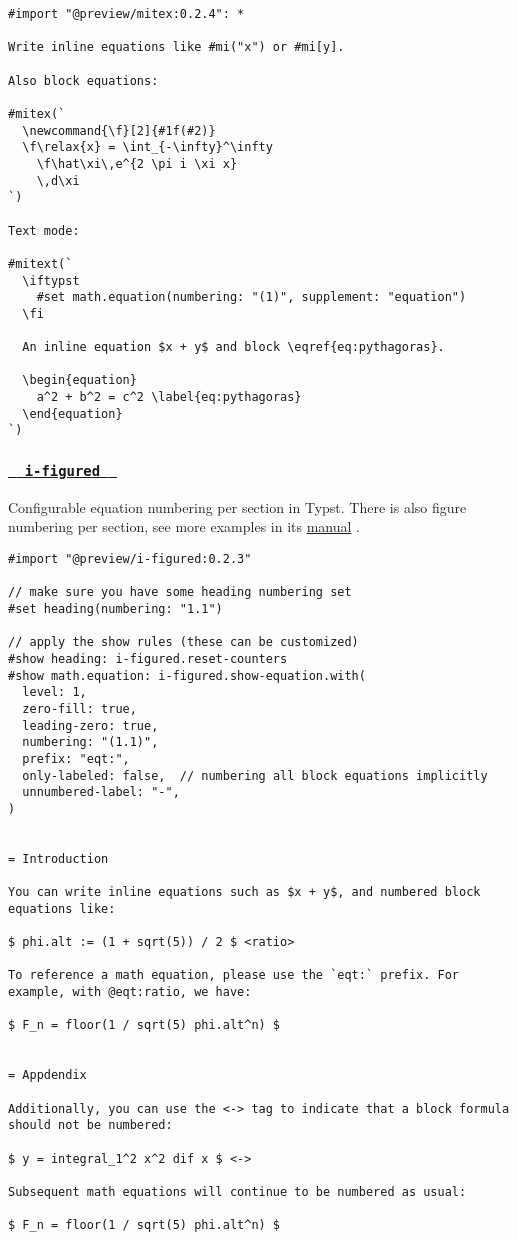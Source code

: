 \begin{verbatim}
#import "@preview/mitex:0.2.4": *

Write inline equations like #mi("x") or #mi[y].

Also block equations:

#mitex(`
  \newcommand{\f}[2]{#1f(#2)}
  \f\relax{x} = \int_{-\infty}^\infty
    \f\hat\xi\,e^{2 \pi i \xi x}
    \,d\xi
`)

Text mode:

#mitext(`
  \iftypst
    #set math.equation(numbering: "(1)", supplement: "equation")
  \fi

  An inline equation $x + y$ and block \eqref{eq:pythagoras}.

  \begin{equation}
    a^2 + b^2 = c^2 \label{eq:pythagoras}
  \end{equation}
`)
\end{verbatim}

\pandocbounded{}

\subsubsection{\texorpdfstring{\hyperref[i-figured]{\texttt{\ }{\texttt{\ i-figured\ }}\texttt{\ }}}{  i-figured  }}\label{i-figured}

Configurable equation numbering per section in Typst. There is also
figure numbering per section, see more examples in its
\href{https://github.com/RubixDev/typst-i-figured}{manual} .

\begin{verbatim}
#import "@preview/i-figured:0.2.3"

// make sure you have some heading numbering set
#set heading(numbering: "1.1")

// apply the show rules (these can be customized)
#show heading: i-figured.reset-counters
#show math.equation: i-figured.show-equation.with(
  level: 1,
  zero-fill: true,
  leading-zero: true,
  numbering: "(1.1)",
  prefix: "eqt:",
  only-labeled: false,  // numbering all block equations implicitly
  unnumbered-label: "-",
)


= Introduction

You can write inline equations such as $x + y$, and numbered block equations like:

$ phi.alt := (1 + sqrt(5)) / 2 $ <ratio>

To reference a math equation, please use the `eqt:` prefix. For example, with @eqt:ratio, we have:

$ F_n = floor(1 / sqrt(5) phi.alt^n) $


= Appdendix

Additionally, you can use the <-> tag to indicate that a block formula should not be numbered:

$ y = integral_1^2 x^2 dif x $ <->

Subsequent math equations will continue to be numbered as usual:

$ F_n = floor(1 / sqrt(5) phi.alt^n) $
\end{verbatim}


